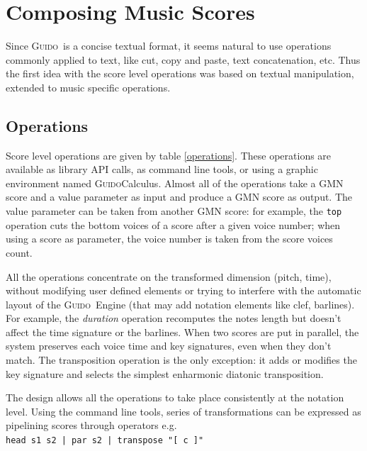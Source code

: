 \documentclass[twoside,10pt,a4paper]{article}
\newcommand{\Guido}		{\textsc{Guido}}
\newcommand{\code}[1]		{{\small \texttt{#1}}}
\begin{document}
\section{Composing Music Scores}

Since \Guido\ is a concise textual format, it seems natural to use operations commonly applied to text, like cut, copy and paste, text concatenation, etc. Thus the first idea with the score level operations was based on textual manipulation, extended to music specific operations.


\subsection{Operations}
Score level operations are given by table \ref{operations}. These operations are available as library API calls, as command line tools, or using a graphic environment named \Guido Calculus. Almost all of the operations take a GMN score and a value parameter as input and produce a GMN score as output. The value parameter can be taken from another GMN score:
for example, the \code{top} operation cuts the bottom voices of a score after a given voice number; when using a score as parameter, the voice number is taken from the score voices count.

All the operations concentrate on the transformed dimension (pitch, time), without modifying user defined elements or trying to interfere with the automatic layout of the \Guido\ Engine (that may add notation elements like clef, barlines). For example, the \emph{duration} operation recomputes the notes length but doesn't affect the time signature or the barlines. 
When two scores are put in parallel, the system preserves each voice time and key signatures, even when they don't match. The transposition operation is the only exception: it adds or modifies the key signature and selects the  simplest enharmonic diatonic transposition. 

The design allows all the operations to take place consistently at the notation level. Using the command line tools, series of transformations can be expressed as pipelining scores through operators e.g. \\
\hspace*{4mm} \code{head s1 s2 | par s2 | transpose "[ c ]" }
\end{document}
